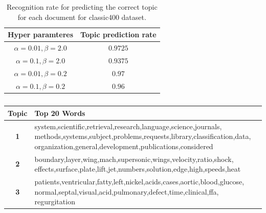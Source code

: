 \documentclass[twoside,12pt]{article}
\begin{document}
\begin{table}[!]
\begin{center}
\begin{tabular}{| c | c |} 
\hline
\textbf{Hyper paramteres}& \textbf{Topic prediction rate}  \\ \hline

$\alpha=0.01,\beta=2.0$ & $0.9725$ \\ \hline
$\alpha=0.1,\beta=2.0$ &  $0.9375$ \\ \hline
$\alpha=0.01,\beta=0.2$ & $0.97$ \\ \hline
$\alpha=0.1,\beta=0.2$ & $0.96$ \\ \hline
 
\end{tabular}
\caption{Recognition rate for predicting the correct topic for each document for classic400 dataset.}
\label{tableClssicRecognition}
\end{center}
\end{table}

\begin{table}[!]
\begin{center}
\begin{tabular}{| c | p{12cm} |}
\hline
\textbf{Topic}& \textbf{Top 20 Words}  \\ \hline
\textbf{1}&system,scientific,retrieval,research,language,science,journals, methods,systems,subject,problems,requests,library,classification,data, organization,general,development,publications,considered\\ \hline
\textbf{2}&boundary,layer,wing,mach,supersonic,wings,velocity,ratio,shock, effects,surface,plate,lift,jet,numbers,solution,edge,high,speeds,heat\\
 \hline
\textbf{3}&patients,ventricular,fatty,left,nickel,acids,cases,aortic,blood,glucose, normal,septal,visual,acid,pulmonary,defect,time,clinical,ffa, regurgitation\\
 \hline
 
\end{tabular}
\caption{}
\label{tableTopWordsClassic}
\end{center}
\end{table}
\end{document}
